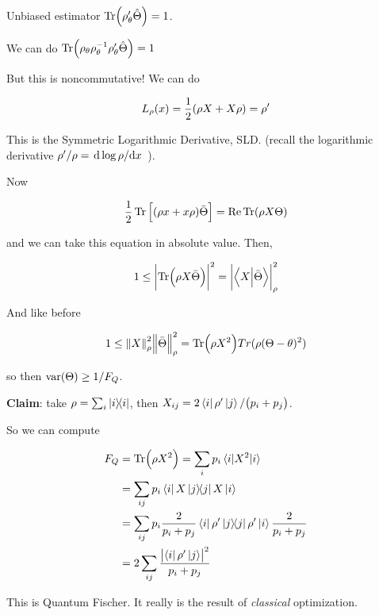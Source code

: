 \documentclass[main_zanardi.tex]{subfiles}
\begin{document}
Unbiased estimator \( \Tr (\rho_\theta ' \hat{\Theta}) = 1 \).

We can do \( \Tr (\rho_\theta \rho_\theta ^{-1} \rho_\theta ' \hat{\Theta}) = 1 \)

But this is noncommutative! We can do

\begin{equation} \label{eq:SLD-def}
  L_\rho (x)  = \frac{1}{2} \qty(\rho X + X \rho) = \rho'
\end{equation}

This is the Symmetric Logarithmic Derivative, SLD.
(recall the logarithmic derivative \( \rho' / \rho = \dv*{\log \rho}{x} \) ).

Now

\begin{equation}
  \frac{1}{2} \Tr \qty[\qty(\rho x + x \rho) \bar{\Theta}] = \Re \Tr (\rho X \Theta)
\end{equation}

and we can take this equation in absolute value. Then,

\begin{equation}
  1 \leq \abs{\Tr (\rho X \bar{\Theta})}^{2} = \abs{\braket{X}{\bar{\Theta}}}^{2}_{\rho}
\end{equation}

And like before

\begin{equation}
  1 \leq \norm{X}^{2} _{\rho}  \norm{\bar{\Theta}}^{2} _{\rho}
  = \Tr (\rho X^2 ) Tr(\rho (\Theta - \theta)^2)
\end{equation}

so then \( \text{var} \qty(\Theta) \geq 1/F_Q \).

\textbf{Claim}: take \( \rho = \sum_i \ketbra{i} \), then \( X _{ij} = 2\bra{i}\rho' \ket{j}/\qty(p_i + p_j) \).

So we can compute

\begin{align}
  F_Q &= \Tr(\rho X^2) = \sum_i p_i \ev{X^2}{i}  \\
  &= \sum _{ij} p_i \bra{i} X \ketbra{j} X \ket{i}  \\
  &= \sum _{ij} p_i \frac{2}{p_i + p_j} \bra{i} \rho' \ketbra{j} \rho' \ket{i} \frac{2}{p_i + p_j}  \\
  &= 2 \sum _{ij} \frac{\abs{\bra{i} \rho' \ket{j}}^2 }{p_i + p_j}
\end{align}

This is Quantum Fischer. It really is the result of \emph{classical} optimization.
\end{document}
